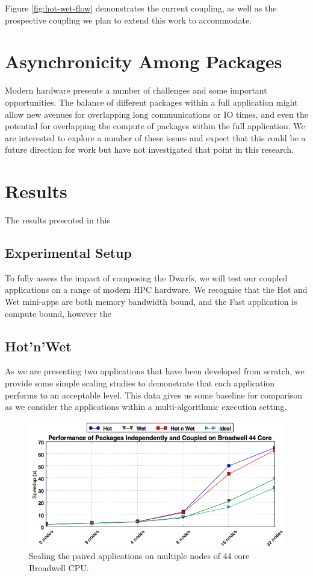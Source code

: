 \documentclass[runningheads,a4paper]{llncs}
\begin{document}
Figure \ref{fig:hot-wet-flow} demonstrates the current coupling, as well as the prospective coupling we plan to extend this work to accommodate. 

\section{Asynchronicity Among Packages}

Modern hardware presents a number of challenges and some important opportunities. The balance of different packages within a full application might allow new avenues for overlapping long communications or IO times, and even the potential for overlapping the compute of packages within the full application. We are interested to explore a number of these issues and expect that this could be a future direction for work but have not investigated that point in this research.

\section{Results}

The results presented in this 

\subsection{Experimental Setup}

To fully assess the impact of composing the Dwarfs, we will test our coupled applications on a range of modern HPC hardware. We recognise that the Hot and Wet mini-apps are both memory bandwidth bound, and the Fast application is compute bound, however the 

\subsection{Hot'n'Wet}

As we are presenting two applications that have been developed from scratch, we provide some simple scaling studies to demonstrate that each application performs to an acceptable level. This data gives us some baseline for comparison as we consider the applications within a multi-algorithmic execution setting.

\begin{figure}
\centering
\includegraphics[width=1.0\linewidth]{cpu_results}
\caption{Scaling the paired applications on multiple nodes of 44 core Broadwell CPU.}
\label{fig:scaling-hot-wet-broadwell}
\end{figure}
\end{document}
